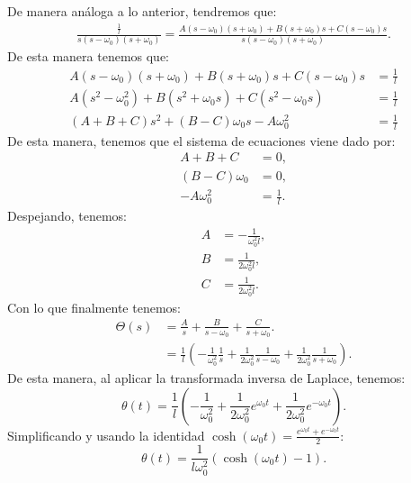\documentclass[
  11pt,
  letterpaper,
   addpoints,
   answers
  ]{exam}
\begin{document}
\begin{questions}
\begin{solution}
De manera análoga a lo anterior, tendremos que:
\begin{align}
    \frac{\frac{1}{l}}{s(s - \omega_0)(s + \omega_0)} = \frac{A(s-\omega_0)(s + \omega_0) + B(s + \omega_0)s + C(s - \omega_0)s}{s(s - \omega_0)(s + \omega_0)}.
\end{align}
De esta manera tenemos que:
\begin{align}
 A(s-\omega_0)(s + \omega_0) + B(s + \omega_0)s + C(s - \omega_0)s &= \frac{1}{l}\\
 A(s^2 - \omega_0^2) + B(s^2 + \omega_0 s) + C(s^2 - \omega_0 s) &= \frac{1}{l}\\
 (A + B + C)s^2 + (B - C)\omega_0 s - A\omega_0^2 &= \frac{1}{l}
\end{align}
De esta manera, tenemos que el sistema de ecuaciones viene dado por:
\begin{align}
    A + B + C &= 0,\\
    (B - C)\omega_0 &= 0,\\
    -A\omega_0^2 &= \frac{1}{l}.
\end{align}
Despejando, tenemos:
\begin{align}
    A&= -\frac{1}{\omega_0^2 l},\\
    B&= \frac{1}{2\omega_0^2 l},\\
    C&= \frac{1}{2\omega_0^2 l}.
\end{align}
Con lo que finalmente tenemos:
\begin{align}
    \Theta(s) &= \frac{A}{s} + \frac{B}{s - \omega_0} + \frac{C}{s + \omega_0}.\\
    &= \frac{1}{l} \left( -\frac{1}{\omega_0^2} \frac{1}{s} + \frac{1}{2\omega_0^2} \frac{1}{s - \omega_0} + \frac{1}{2\omega_0^2} \frac{1}{s + \omega_0} \right).
\end{align}
De esta manera, al aplicar la transformada inversa de Laplace, tenemos:
\begin{equation}
\theta(t) = \frac{1}{l} \left( -\frac{1}{\omega_0^2} + \frac{1}{2\omega_0^2} e^{\omega_0 t} + \frac{1}{2\omega_0^2} e^{-\omega_0 t} \right).
\end{equation}
Simplificando y usando la identidad \(\cosh(\omega_0 t) = \frac{e^{\omega_0 t} + e^{-\omega_0 t}}{2}\):
\begin{equation}
\theta(t) = \frac{1}{l\omega_0^2} \left( \cosh(\omega_0 t) - 1 \right).
\end{equation}

\end{solution}
\end{questions}
\end{document}
